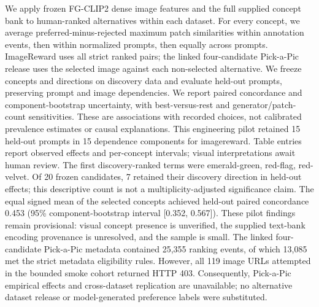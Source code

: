 We apply frozen FG-CLIP2 dense image features and the full supplied concept bank to human-ranked alternatives within each dataset. For every concept, we average preferred-minus-rejected maximum patch similarities within annotation events, then within normalized prompts, then equally across prompts. ImageReward uses all strict ranked pairs; the linked four-candidate Pick-a-Pic release uses the selected image against each non-selected alternative. We freeze concepts and directions on discovery data and evaluate held-out prompts, preserving prompt and image dependencies. We report paired concordance and component-bootstrap uncertainty, with best-versus-rest and generator/patch-count sensitivities. These are associations with recorded choices, not calibrated prevalence estimates or causal explanations. This engineering pilot retained 15 held-out prompts in 15 dependence components for imagereward. Table entries report observed effects and per-concept intervals; visual interpretations await human review.
The first discovery-ranked terms were emerald-green, red-flag, red-velvet. Of 20 frozen candidates, 7 retained their discovery direction in held-out effects; this descriptive count is not a multiplicity-adjusted significance claim. The equal signed mean of the selected concepts achieved held-out paired concordance 0.453 (95\% component-bootstrap interval [0.352, 0.567]). These pilot findings remain provisional: visual concept presence is unverified, the supplied text-bank encoding provenance is unresolved, and the sample is small.
The linked four-candidate Pick-a-Pic metadata contained 25,355 ranking events, of which 13,085 met the strict metadata eligibility rules. However, all 119 image URLs attempted in the bounded smoke cohort returned HTTP 403. Consequently, Pick-a-Pic empirical effects and cross-dataset replication are unavailable; no alternative dataset release or model-generated preference labels were substituted.
